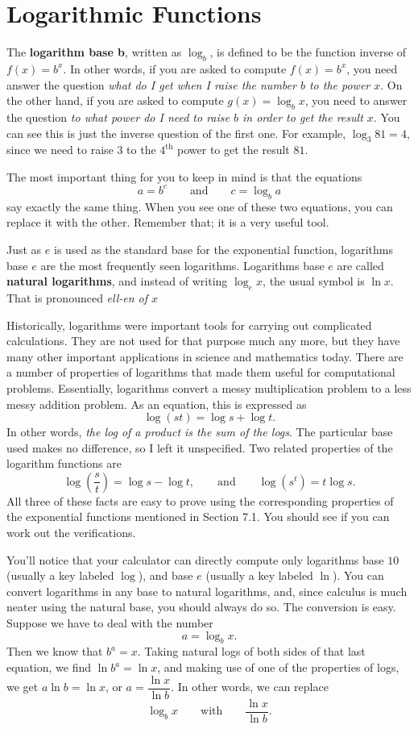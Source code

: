 \section{Logarithmic Functions}

The \textbf{logarithm base b}, written as $\log_b$, is defined to
be the function inverse of $f(x)=b^x$. In other words, if you are asked
to compute $f(x) = b^x$, you need answer the question \emph{what do I get
when I raise the number $b$ to the power $x$}. On the other hand, if
you are asked to compute $g(x)=\log_b x$, you need to answer the
question \emph{to what power do I need to raise $b$ in order to get the result $x$}.
You can see this is just the inverse question of the first one. For
example, $\log_3 81 = 4$, since we need to raise $3$ to the $4^\text{th}$
power to get the result $81$.

The most important thing for you to keep in mind is that the
equations
\[a=b^c\qquad\text{and}\qquad c=\log_b a\]
say exactly the same thing. When you see one of these two equations, you
can replace it with the other. Remember that; it is a very useful
tool.

Just as $e$ is used as the standard base for the exponential
function, logarithms base $e$ are the most frequently seen logarithms.
Logarithms base $e$ are called \textbf{natural logarithms}, and instead of
writing $\log_e x$, the usual symbol is $\ln x$.  That  is pronounced 
\emph{ell-en of $x$}

Historically, logarithms were important tools for carrying out
complicated calculations. They are not used for that purpose much any
more, but they have many other important applications in science and
mathematics today. There are a number of properties of logarithms that
made them useful for computational problems. Essentially, logarithms
convert a messy multiplication problem to a less messy addition problem.
As an equation, this is expressed as
\[\log(st) = \log s + \log t.\]
In other words, \emph{the log of a product is the sum of the logs}.
The particular base used makes no difference, so I left it unspecified.
Two related properties of the logarithm functions are
\[
 \log\left(\frac st\right) = \log s - \log t,
 \qquad\text{and}\qquad
 \log \left(s^t\right) = t\log s.
\]
All three of these facts are easy to prove using the corresponding
properties of the exponential functions mentioned in Section 7.1. You
should see if you can work out the verifications.

You'll notice that your calculator can directly compute only
logarithms base $10$ (usually a key labeled $\log$), and base $e$
(usually a key labeled $\ln$). You can convert logarithms in any base to
natural logarithms, and, since calculus is much neater using the natural
base, you should always do so. The conversion is easy. Suppose we
have to deal with the number
\[a = \log_b x.\]
Then we know that $b^a=x$.
Taking natural logs of both sides of that last equation, we find
$\ln b^a=\ln x$,
and making use of one of the properties of logs, we
get $a\ln b = \ln x$,
or $a=\dfrac{\ln x}{\ln b}.$
In other words, we
can replace 
\[\log_b x\qquad\text{with}\qquad\frac{\ln x}{\ln b}.\]
